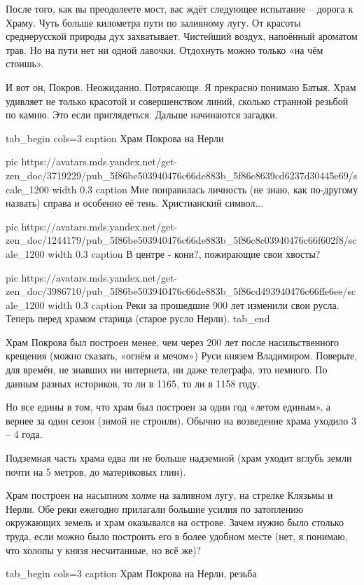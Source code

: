 После того, как вы преодолеете мост, вас ждёт следующее испытание – дорога к
Храму. Чуть больше километра пути по заливному лугу. От красоты среднерусской
природы дух захватывает. Чистейший воздух, напоённый ароматом трав. Но на пути
нет ни одной лавочки. Отдохнуть можно только «на чём стоишь».


И вот он, Покров. Неожиданно. Потрясающе. Я прекрасно понимаю Батыя. Храм
удивляет не только красотой и совершенством линий, сколько странной резьбой по
камню. Это если приглядеться. Дальше начинаются загадки.

\ifcmt
tab_begin cols=3
  caption Храм Покрова на Нерли

  pic https://avatars.mds.yandex.net/get-zen_doc/3719229/pub_5f86be503940476c66de883b_5f86c8639cd6237d30445e69/scale_1200
  width 0.3
  caption Мне понравилась личность (не знаю, как по-другому назвать) справа и особенно её тень. Христианский символ...

  pic https://avatars.mds.yandex.net/get-zen_doc/1244179/pub_5f86be503940476c66de883b_5f86c8c03940476c66f602f8/scale_1200
  width 0.3
  caption В центре - кони?, пожирающие свои хвосты?

  pic https://avatars.mds.yandex.net/get-zen_doc/3986710/pub_5f86be503940476c66de883b_5f86cd493940476c66ffe6ee/scale_1200
  width 0.3
  caption Реки за прошедшие 900 лет изменили свои русла. Теперь перед храмом старица (старое русло Нерли).
tab_end
\fi

Храм Покрова был построен менее, чем через 200 лет после насильственного
крещения (можно сказать, «огнём и мечом») Руси князем Владимиром. Поверьте, для
времён, не знавших ни интернета, ни даже телеграфа, это немного. По данным
разных историков, то ли в 1165, то ли в 1158 году.

Но все едины в том, что храм был построен за один год «летом единым», а вернее
за один сезон (зимой не строили). Обычно на возведение храма уходило 3 – 4
года.

Подземная часть храма едва ли не больше надземной (храм уходит вглубь земли
почти на 5 метров, до материковых глин).

Храм построен на насыпном холме на заливном лугу, на стрелке Клязьмы и Нерли.
Обе реки ежегодно прилагали большие усилия по затоплению окружающих земель и
храм оказывался на острове. Зачем нужно было столько труда, если можно было
построить его в более удобном месте (нет, я понимаю, что холопы у князя
несчитанные, но всё же)?


\ifcmt
tab_begin cols=3
  caption Храм Покрова на Нерли, резьба


